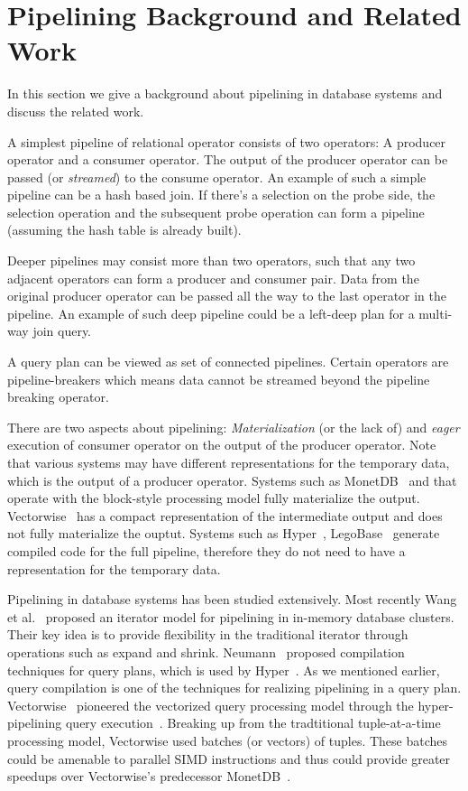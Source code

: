\section{Pipelining Background and Related Work}\label{sec:pipe-background}
In this section we give a background about pipelining in database systems and discuss the related work. 

A simplest pipeline of relational operator consists of two operators: A producer operator and a consumer operator. 
The output of the producer operator can be passed (or \textit{streamed}) to the consume operator. 
An example of such a simple pipeline can be a hash based join. 
If there's a selection on the probe side, the selection operation and the subsequent probe operation can form a pipeline (assuming the hash table is already built).

Deeper pipelines may consist more than two operators, such that any two adjacent operators can form a producer and consumer pair.
Data from the original producer operator can be passed all the way to the last operator in the pipeline. 
An example of such deep pipeline could be a left-deep plan for a multi-way join query.

A query plan can be viewed as set of connected pipelines. 
Certain operators are pipeline-breakers which means data cannot be streamed beyond the pipeline breaking operator. 

There are two aspects about pipelining: \textit{Materialization} (or the lack of) and \textit{eager} execution of consumer operator on the output of the producer operator. 
Note that various systems may have different representations for the temporary data, which is the output of a producer operator. 
Systems such as MonetDB~\cite{monetdb} and \sys{} that operate with the block-style processing model fully materialize the output. 
Vectorwise~\cite{vectorwise} has a compact representation of the intermediate output and does not fully materialize the ouptut.
Systems such as Hyper~\cite{hyper}, LegoBase~\cite{legobase} generate compiled code for the full pipeline, therefore they do not need to have a representation for the temporary data.

Pipelining in database systems has been studied extensively. 
Most recently Wang et al.~\cite{elastic-pipelining} proposed an iterator model for pipelining in in-memory database clusters.
Their key idea is to provide flexibility in the traditional iterator through operations such as expand and shrink.
Neumann~\cite{DBLP:journals/pvldb/Neumann11} proposed compilation techniques for query plans, which is used by Hyper~\cite{hyper, morsel}. 
As we mentioned earlier, query compilation is one of the techniques for realizing pipelining in a query plan. 
Vectorwise~\cite{vectorwise} pioneered the vectorized query processing model through the hyper-pipelining query execution~\cite{hyper-pipelining}.
Breaking up from the tradtitional tuple-at-a-time processing model, Vectorwise used batches (or vectors) of tuples. 
These batches could be amenable to parallel SIMD instructions and thus could provide greater speedups over Vectorwise's predecessor MonetDB~\cite{monetdb}.


